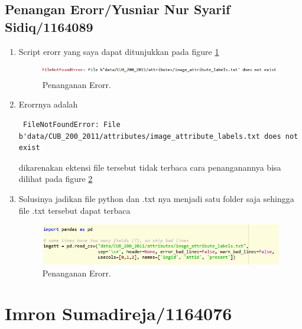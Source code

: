 \subsection{Penangan Erorr/Yusniar Nur Syarif Sidiq/1164089}
\begin{enumerate}

\item Script erorr yang saya dapat ditunjukkan pada figure \ref{YNErorrC3}

	\begin{figure}[ht]
	\centerline{\includegraphics[width=1\textwidth]{figures/YN/Chapter3/YNErorrC3.png}}
	\caption{Penanganan Erorr.}
	\label{YNErorrC3}
	\end{figure}	

\item Erorrnya adalah
\begin{verbatim}
 FileNotFoundError: File b'data/CUB_200_2011/attributes/image_attribute_labels.txt does not exist
\end{verbatim}
 dikarenakan ektensi file tersebut tidak terbaca cara penanganannya bisa dilihat pada figure \ref{YNErorr2C3}

\item Solusinya jadikan file python dan .txt nya menjadi satu folder saja sehingga file .txt tersebut dapat terbaca
	
	\begin{figure}[ht]
	\centerline{\includegraphics[width=1\textwidth]{figures/YN/Chapter3/YNErorr2C3.png}}
	\caption{Penanganan Erorr.}
	\label{YNErorr2C3}
	\end{figure}	


\end{enumerate}


\section{Imron Sumadireja/1164076}
